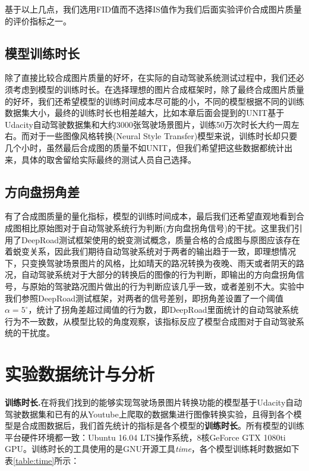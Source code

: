 基于以上几点，我们选用FID值而不选择IS值作为我们后面实验评价合成图片质量的评价指标之一。

\subsection{模型训练时长}

除了直接比较合成图片质量的好坏，在实际的自动驾驶系统测试过程中，我们还必须考虑到模型的训练时长。在选择理想的图片合成框架时，除了最终合成图片质量的好坏，我们还希望模型的训练时间成本尽可能的小，不同的模型根据不同的训练数据集大小，最终的训练时长也相差越大，比如本章后面会提到的UNIT\cite{UNIT}基于Udacity自动驾驶数据集\cite{udacity_dataset}和大约3000张驾驶场景图片，训练50万次时长大约一周左右。而对于一些图像风格转换(Neural Style Transfer)模型来说，训练时长却只要几个小时，虽然最后合成图的质量不如UNIT，但我们希望把这些数据都统计出来，具体的取舍留给实际最终的测试人员自己选择。 

\subsection{方向盘拐角差}

有了合成图质量的量化指标，模型的训练时间成本，最后我们还希望直观地看到合成图相比原始图对于自动驾驶系统行为判断(方向盘拐角信号)的干扰。这里我们引用了DeepRoad测试框架使用的蜕变测试概念，质量合格的合成图与原图应该存在着蜕变关系，因此我们期待自动驾驶系统对于两者的输出趋于一致，即理想情况下，只变换驾驶场景图片的风格，比如晴天的路况转换为夜晚、雨天或者阴天的路况，自动驾驶系统对于大部分的转换后的图像的行为判断，即输出的方向盘拐角信号，与原始的驾驶路况图片做出的行为判断应该几乎一致，或者差别不大。实验中我们参照DeepRoad测试框架，对两者的信号差别，即拐角差设置了一个阈值$\alpha=5^{\circ}$，统计了拐角差超过阈值的行为数，即DeepRoad里面统计的自动驾驶系统行为不一致数，从模型比较的角度观察，该指标反应了模型合成图对于自动驾驶系统的干扰度。

\section{实验数据统计与分析}

\textbf{训练时长.}\quad 在将我们找到的能够实现驾驶场景图片转换功能的模型基于Udacity自动驾驶数据集\cite{udacity_dataset}和已有的从Youtube上爬取的数据集进行图像转换实验，且得到各个模型是合成图数据后，我们首先统计的指标是各个模型的\textbf{训练时长}。所有模型的训练平台硬件环境都一致：Ubuntu 16.04 LTS操作系统，8核GeForce GTX 1080ti GPU。训练时长的工具使用的是GNU开源工具\textit{time}，各个模型训练耗时数据如下表\ref{table:time}所示：

